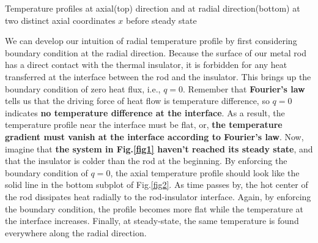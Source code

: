 \begin{marginfigure}
\caption{Temperature profiles at axial(top) direction and at radial direction(bottom) at two distinct axial coordinates $x$ before steady state}
\label{fig2}
\end{marginfigure}

 We can develop our intuition of radial temperature profile by first considering boundary condition at the radial direction. Because the surface of our metal rod has a direct contact with the thermal insulator, it is forbidden for any heat transferred at the interface between the rod and the insulator. This brings up the boundary condition of zero heat flux, i.e., $q=0$. Remember that \textbf{Fourier's law} tells us that the driving force of heat flow is temperature difference, so $q=0$ indicates \textbf{no temperature difference at the interface}. As a result, the temperature profile near the interface must be flat, or, \textbf{the temperature gradient must vanish at the interface according to Fourier's law}. Now, imagine that \textbf{the system in Fig.\ref{fig1} haven't reached its steady state}, and that the insulator is colder than the rod at the beginning. By enforcing the boundary condition of $q=0$, the axial temperature profile should look like the solid line in the bottom subplot of Fig.\ref{fig2}. As time passes by, the hot center of the rod dissipates heat radially to the rod-insulator interface. Again, by enforcing the boundary condition, the profile becomes more flat while the temperature at the interface increases. Finally, at steady-state, the same temperature is found everywhere along the radial direction.

